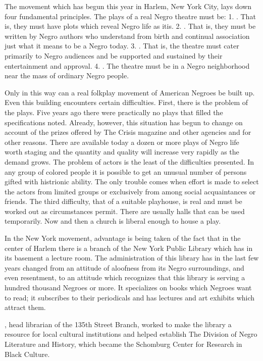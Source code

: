 \documentclass[letterpaper,10pt,english]{jupyterBook}
\begin{document}
\sphinxAtStartPar
The movement which has begun this year in Harlem, New York City, lays down four fundamental principles. The plays of a real Negro theatre must be: 1. . That is, they must have plots which reveal Negro life as itis. 2. . That is, they must be written by Negro authors who understand from birth and continual association just what it means to be a Negro today. 3. . That is, the theatre must cater primarily to Negro audiences and be supported and sustained by their entertainment and approval. 4. . The theatre must be in a Negro neighborhood near the mass of ordinary Negro people.

\sphinxAtStartPar
Only in this way can a real folk\sphinxhyphen{}play movement of American Negroes be built up. Even this building encounters certain difficulties. First, there is the problem of the plays. Five years ago there were practically no plays that filled the specifications noted. Already, however, this situation has begun to change on account of the prizes offered by The Crisis magazine and other agencies and for other reasons. There are available today a dozen or more plays of Negro life worth staging and the quantity and quality will increase very rapidly as the demand grows. The problem of actors is the least of the difficulties presented. In any group of colored people it is possible to get an unusual number of persons gifted with histrionic ability. The only trouble comes when effort is made to select the actors from limited groups or exclusively from among social acquaintances or friends. The third difficulty, that of a suitable playhouse, is real and must be worked out as circumstances permit. There are usually halls that can be used temporarily. Now and then a church is liberal enough to house a play.

\sphinxAtStartPar
In the New York movement, advantage is being taken of the fact that in the center of Harlem there is a branch of the New York Public Library which has in its basement a lecture room. The administration of this library has in the last few years changed from an attitude of aloofness from its Negro surroundings, and even resentment, to an attitude which recognizes that this library is serving a hundred thousand Negroes or more. It specializes on books which Negroes want to read; it subscribes to their periodicals and has lectures and art exhibits which attract them.

\begin{sphinxShadowBox}
\sphinxstylesidebartitle{}

\sphinxAtStartPar
{}, head librarian of the 135th Street Branch, worked to make the library a resource for local cultural institutions and  helped establish The Division of Negro Literature and History, which became the Schomburg Center for Research in Black Culture.
\end{sphinxShadowBox}
\end{document}
